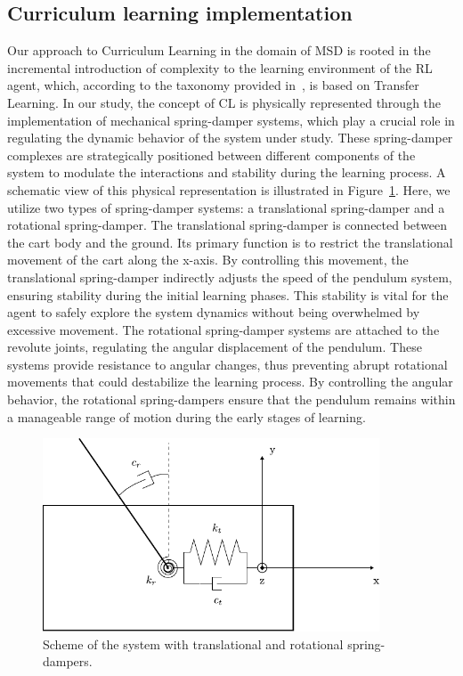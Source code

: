 \subsection{Curriculum learning implementation} \label{Curriculum learning implementation}
Our approach to Curriculum Learning in the domain of MSD is rooted in the incremental introduction of complexity to the learning environment of the RL agent, which, according to the taxonomy provided in~\cite{narvekar2020survey}, is based on Transfer Learning.
In our study, the concept of CL is physically represented through the implementation of mechanical spring-damper systems, which play a crucial role in regulating the dynamic behavior of the system under study. These spring-damper complexes are strategically positioned between different components of the system to modulate the interactions and stability during the learning process. A schematic view of this physical representation is illustrated in Figure~\ref{fig: cl mechanical implementation}. Here, we utilize two types of spring-damper systems: a translational spring-damper and a rotational spring-damper. The translational spring-damper is connected between the cart body and the ground. Its primary function is to restrict the translational movement of the cart along the x-axis. By controlling this movement, the translational spring-damper indirectly adjusts the speed of the pendulum system, ensuring stability during the initial learning phases. This stability is vital for the agent to safely explore the system dynamics without being overwhelmed by excessive movement. The rotational spring-damper systems are attached to the revolute joints, regulating the angular displacement of the pendulum. These systems provide resistance to angular changes, thus preventing abrupt rotational movements that could destabilize the learning process. By controlling the angular behavior, the rotational spring-dampers ensure that the pendulum remains within a manageable range of motion during the early stages of learning.

\begin{figure}[h]
	\centering
	\includegraphics[width=10cm]{Figures/cl_mech_implementation_v1.pdf}
	\caption{Scheme of the system with translational and rotational spring-dampers.}
	\label{fig: cl mechanical implementation}
\end{figure}

